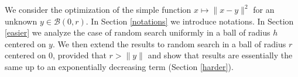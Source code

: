 We consider the optimization of the simple function $x\mapsto \lVert x-y\rVert ^2$ for an unknown $y\in \mathcal{B}(0,r)$.
In Section \ref{notations} we introduce notations.
In Section \ref{easier} we analyze the case of random search uniformly in a ball of radius $h$ centered on $y$.  We then extend the results to random search in a ball of radius $r$ centered on $0$, provided that $r>\rVert y\rVert $ and show that results are essentially the same up to an exponentially decreasing term (Section \ref{harder}).
